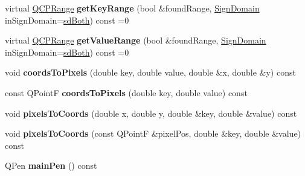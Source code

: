\begin{DoxyCompactItemize}
\item 
virtual \hyperlink{class_q_c_p_range}{Q\+C\+P\+Range} {\bfseries get\+Key\+Range} (bool \&found\+Range, \hyperlink{class_q_c_p_abstract_plottable_a661743478a1d3c09d28ec2711d7653d8}{Sign\+Domain} in\+Sign\+Domain=\hyperlink{class_q_c_p_abstract_plottable_a661743478a1d3c09d28ec2711d7653d8a082b98cfb91a7363a3b5cd17b0c1cd60}{sd\+Both}) const =0\hypertarget{class_q_c_p_abstract_plottable_a345d702b2e7e12c8cfdddff65ba85e8c}{}\label{class_q_c_p_abstract_plottable_a345d702b2e7e12c8cfdddff65ba85e8c}

\item 
virtual \hyperlink{class_q_c_p_range}{Q\+C\+P\+Range} {\bfseries get\+Value\+Range} (bool \&found\+Range, \hyperlink{class_q_c_p_abstract_plottable_a661743478a1d3c09d28ec2711d7653d8}{Sign\+Domain} in\+Sign\+Domain=\hyperlink{class_q_c_p_abstract_plottable_a661743478a1d3c09d28ec2711d7653d8a082b98cfb91a7363a3b5cd17b0c1cd60}{sd\+Both}) const =0\hypertarget{class_q_c_p_abstract_plottable_aa3331b415b5939fe4df60b78831b2799}{}\label{class_q_c_p_abstract_plottable_aa3331b415b5939fe4df60b78831b2799}

\item 
void {\bfseries coords\+To\+Pixels} (double key, double value, double \&x, double \&y) const \hypertarget{class_q_c_p_abstract_plottable_ade710a776104b14c1c835168ce1bfc5c}{}\label{class_q_c_p_abstract_plottable_ade710a776104b14c1c835168ce1bfc5c}

\item 
const Q\+PointF {\bfseries coords\+To\+Pixels} (double key, double value) const \hypertarget{class_q_c_p_abstract_plottable_a9fd1c9df8391781f05b0be22fbe91e13}{}\label{class_q_c_p_abstract_plottable_a9fd1c9df8391781f05b0be22fbe91e13}

\item 
void {\bfseries pixels\+To\+Coords} (double x, double y, double \&key, double \&value) const \hypertarget{class_q_c_p_abstract_plottable_a10408828446e9e0681c46d65120f382e}{}\label{class_q_c_p_abstract_plottable_a10408828446e9e0681c46d65120f382e}

\item 
void {\bfseries pixels\+To\+Coords} (const Q\+PointF \&pixel\+Pos, double \&key, double \&value) const \hypertarget{class_q_c_p_abstract_plottable_a3e2c361cfcdfd5d803ada4d333a07e15}{}\label{class_q_c_p_abstract_plottable_a3e2c361cfcdfd5d803ada4d333a07e15}

\item 
Q\+Pen {\bfseries main\+Pen} () const \hypertarget{class_q_c_p_abstract_plottable_a19276ed2382a3a06464417b8788b1451}{}\label{class_q_c_p_abstract_plottable_a19276ed2382a3a06464417b8788b1451}


\end{DoxyCompactItemize}
